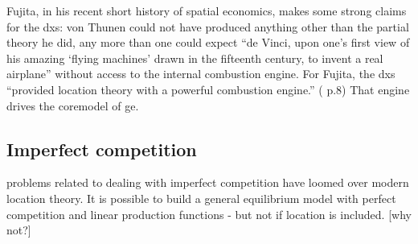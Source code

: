 Fujita, in his recent short history of spatial economics, makes some strong claims for the \gls{dxs}: von Thunen could not have produced anything other than the partial theory he did, any more than one could expect ``de Vinci, upon one's first view of his amazing `flying machines' drawn in the fifteenth century, to invent a real airplane'' without access to the internal combustion engine. For Fujita, the \gls{dxs} ``provided location theory with a powerful combustion engine.'' (\citealt{fujita_evolution_2010} p.8) That engine drives the \gls{coremodel} of \gls{ge}.




\subsection{Imperfect competition \label{sec:imperfect}}

problems related to dealing with imperfect competition have loomed over modern location theory. It is possible to build a general equilibrium model with perfect competition and linear production functions - but not if location is included. [why not?]







